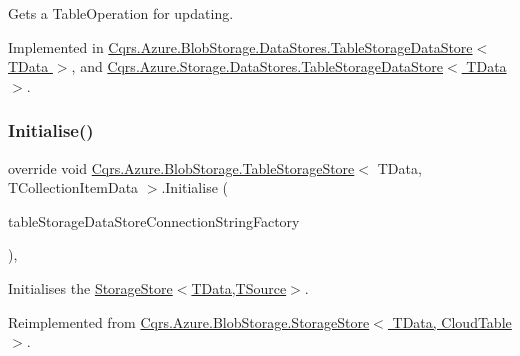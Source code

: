 Gets a Table\+Operation for updating. 



Implemented in \hyperlink{classCqrs_1_1Azure_1_1BlobStorage_1_1DataStores_1_1TableStorageDataStore_aa4dc1bfeeb55483b68d8af3414000f7a_aa4dc1bfeeb55483b68d8af3414000f7a}{Cqrs.\+Azure.\+Blob\+Storage.\+Data\+Stores.\+Table\+Storage\+Data\+Store$<$ T\+Data $>$}, and \hyperlink{classCqrs_1_1Azure_1_1Storage_1_1DataStores_1_1TableStorageDataStore_a54f00f53521e285568f19c29527d6466_a54f00f53521e285568f19c29527d6466}{Cqrs.\+Azure.\+Storage.\+Data\+Stores.\+Table\+Storage\+Data\+Store$<$ T\+Data $>$}.

\mbox{\label{classCqrs_1_1Azure_1_1BlobStorage_1_1TableStorageStore_ae775f039a168cc48c731314c7e494bb6_ae775f039a168cc48c731314c7e494bb6}} 
\subsubsection{\texorpdfstring{Initialise()}{Initialise()}}
{\footnotesize\ttfamily override void \hyperlink{classCqrs_1_1Azure_1_1BlobStorage_1_1TableStorageStore}{Cqrs.\+Azure.\+Blob\+Storage.\+Table\+Storage\+Store}$<$ T\+Data, T\+Collection\+Item\+Data $>$.Initialise (\begin{DoxyParamCaption}\item[{\hyperlink{interfaceCqrs_1_1Azure_1_1BlobStorage_1_1IStorageStoreConnectionStringFactory}{I\+Storage\+Store\+Connection\+String\+Factory}}]{table\+Storage\+Data\+Store\+Connection\+String\+Factory }\end{DoxyParamCaption})\hspace{0.3cm}{\ttfamily [protected]}, {\ttfamily [virtual]}}



Initialises the \hyperlink{classCqrs_1_1Azure_1_1BlobStorage_1_1StorageStore_ae7a725cdcb7de73e097b02c19463bae7_ae7a725cdcb7de73e097b02c19463bae7}{Storage\+Store$<$\+T\+Data,\+T\+Source$>$}. 



Reimplemented from \hyperlink{classCqrs_1_1Azure_1_1BlobStorage_1_1StorageStore_a8d16603267a768190f2c49ca3d1c439e_a8d16603267a768190f2c49ca3d1c439e}{Cqrs.\+Azure.\+Blob\+Storage.\+Storage\+Store$<$ T\+Data, Cloud\+Table $>$}.


